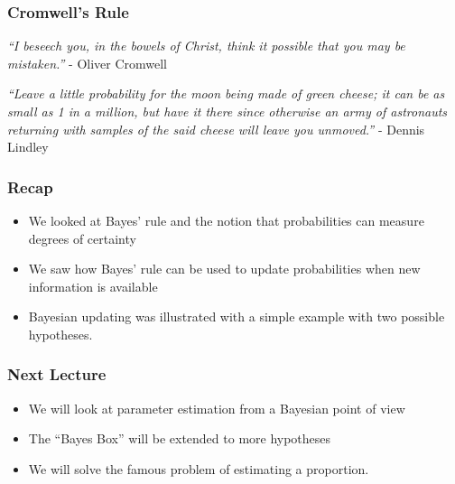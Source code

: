 \documentclass{beamer}
\begin{document}
\begin{frame}
\frametitle{Cromwell's Rule}

{\em ``I beseech you, in the bowels of Christ, think it possible that
you may be mistaken.''} - Oliver Cromwell \\[1em]\pause

{\em ``Leave a little probability for the moon being made of green
cheese; it can be as small as 1 in a million, but have it
there since otherwise an army of astronauts returning
with samples of the said cheese will leave you unmoved.''}
- Dennis Lindley

\end{frame}


\begin{frame}
\frametitle{Recap}

\begin{itemize}
\item We looked at Bayes' rule and the notion that probabilities
can measure degrees of certainty
\item We saw how Bayes' rule can be used to update
probabilities when new information is available
\item Bayesian updating was illustrated with a simple example
with two possible hypotheses.
\end{itemize}

\end{frame}

\begin{frame}
\frametitle{Next Lecture}

\begin{itemize}
\item We will look at parameter estimation from a Bayesian
point of view
\item The ``Bayes Box'' will be extended to more hypotheses
\item We will solve the famous problem of estimating a
proportion.
\end{itemize}

\end{frame}
\end{document}
